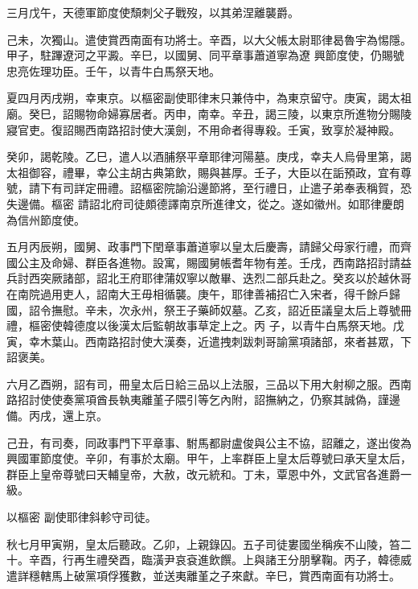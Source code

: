 \begin{pinyinscope}
 三月戊午，天德軍節度使頹刺父子戰歿，以其弟涅離襲爵。



 己未，次獨山。遣使賞西南面有功將士。辛酉，以大父帳太尉耶律曷魯宇為惕隱。甲子，駐蹕遼河之平澱。辛巳，以國舅、同平章事蕭道寧為遼
 興節度使，仍賜號忠亮佐理功臣。壬午，以青牛白馬祭天地。



 夏四月丙戌朔，幸東京。以樞密副使耶律末只兼侍中，為東京留守。庚寅，謁太祖廟。癸巳，詔賜物命婦寡居者。丙申，南幸。辛丑，謁三陵，以東京所進物分賜陵寢官吏。復詔賜西南路招討使大漢劍，不用命者得專殺。壬寅，致享於凝神殿。



 癸卯，謁乾陵。乙巳，遣人以酒脯祭平章耶律河陽墓。庚戌，幸夫人烏骨里第，謁太祖御容，禮畢，幸公主胡古典第飲，賜與甚厚。壬子，大臣以在詬預政，宜有尊號，請下有司詳定冊禮。詔樞密院諭沿邊節將，至行禮日，止遣子弟奉表稱賀，恐失邊備。樞密
 請詔北府司徒頗德譯南京所進律文，從之。遂如徽州。如耶律慶朗為信州節度使。



 五月丙辰朔，國舅、政事門下閏章事蕭道寧以皇太后慶壽，請歸父母家行禮，而齊國公主及命婦、群臣各進物。設寓，賜國舅帳耆年物有差。壬戌，西南路招討請益兵討西突厥諸部，詔北王府耶律蒲奴寧以敵畢、迭烈二部兵赴之。癸亥以於越休哥在南院過用吏人，詔南大王毋相循襲。庚午，耶律善補招亡入宋者，得千餘戶歸國，詔令撫慰。辛未，次永州，祭王子藥師奴墓。乙亥，詔近臣議皇太后上尊號冊禮，樞密使韓德度以後漢太后監朝故事草定上之。丙
 子，以青牛白馬祭天地。戊寅，幸木葉山。西南路招討使大漢奏，近遣拽刺跋刺哥諭黨項諸部，來者甚眾，下詔褒美。



 六月乙酉朔，詔有司，冊皇太后日給三品以上法服，三品以下用大射柳之服。西南路招討使使奏黨項酋長執夷離堇子隈引等乞內附，詔撫納之，仍察其誠偽，謹邊備。丙戌，還上京。



 己丑，有司奏，同政事門下平章事、駙馬都尉盧俊與公主不協，詔離之，遂出俊為興國軍節度使。辛卯，有事於太廟。甲午，上率群臣上皇太后尊號曰承天皇太后，群臣上皇帝尊號曰天輔皇帝，大赦，改元統和。丁未，覃恩中外，文武官各進爵一級。



 以樞密
 副使耶律斜軫守司徒。



 秋七月甲寅朔，皇太后聽政。乙卯，上親錄囚。五子司徒婁國坐稱疾不山陵，笞二十。辛酉，行再生禮癸酉，臨潢尹哀袞進飲饌。上與諸王分朋擊鞠。丙子，韓德威遣詳穩轄馬上破黨項俘獲數，並送夷離堇之子來獻。辛巳，賞西南面有功將士。




\end{pinyinscope}
